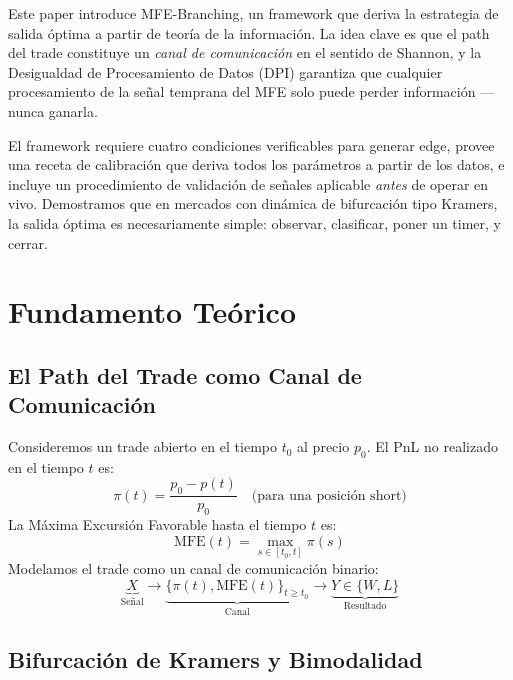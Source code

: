 \documentclass[11pt,a4paper]{article}
\begin{document}
Este paper introduce MFE-Branching, un framework que deriva la estrategia de salida óptima a partir de teoría de la información. La idea clave es que el path del trade constituye un \emph{canal de comunicación} en el sentido de Shannon, y la Desigualdad de Procesamiento de Datos (DPI) garantiza que cualquier procesamiento de la señal temprana del MFE solo puede perder información ---nunca ganarla.

El framework requiere cuatro condiciones verificables para generar edge, provee una receta de calibración que deriva todos los parámetros a partir de los datos, e incluye un procedimiento de validación de señales aplicable \emph{antes} de operar en vivo. Demostramos que en mercados con dinámica de bifurcación tipo Kramers, la salida óptima es necesariamente simple: observar, clasificar, poner un timer, y cerrar.

\section{Fundamento Teórico}

\subsection{El Path del Trade como Canal de Comunicación}

Consideremos un trade abierto en el tiempo $t_0$ al precio $p_0$. El PnL no realizado en el tiempo $t$ es:
\begin{equation}
    \pi(t) = \frac{p_0 - p(t)}{p_0} \quad \text{(para una posición short)}
\end{equation}
La Máxima Excursión Favorable hasta el tiempo $t$ es:
\begin{equation}
    \text{MFE}(t) = \max_{s \in [t_0, t]} \pi(s)
\end{equation}
Modelamos el trade como un canal de comunicación binario:
\begin{equation}
    \underbrace{X}_{\text{Señal}} \longrightarrow \underbrace{\{\pi(t), \text{MFE}(t)\}_{t \geq t_0}}_{\text{Canal}} \longrightarrow \underbrace{Y \in \{W, L\}}_{\text{Resultado}}
\end{equation}

\subsection{Bifurcación de Kramers y Bimodalidad}
\end{document}
